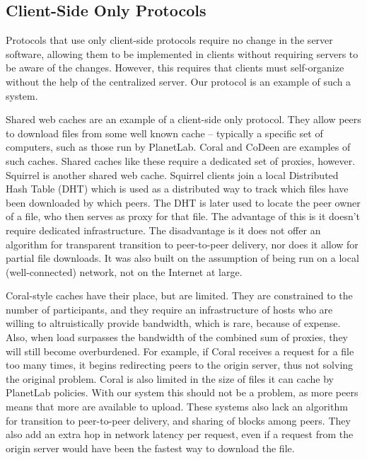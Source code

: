 \subsection{Client-Side Only Protocols}
Protocols that use only client-side protocols require no change in the server software, allowing them to be implemented in clients without requiring servers to be aware of the changes.  However, this requires that clients must self-organize without the help of the centralized server.  Our protocol is an example of such a system.

Shared web caches are an example of a client-side only protocol.  They allow peers to download files from some well known cache -- typically a specific set of computers, such as those run by PlanetLab.  Coral \cite{coral} and CoDeen \cite{codeen} are examples of such caches.  Shared caches like these require a dedicated set of proxies, however.  Squirrel \cite{squirrel} is another shared web cache.  Squirrel clients join a local Distributed Hash Table (DHT) 
which is used as a distributed way to track which files have been downloaded by which peers.  The DHT is later used to locate the peer owner of a file, who then serves as proxy for that file.  The advantage of this is it doesn't require dedicated infrastructure.  The disadvantage is it does not offer an algorithm for transparent transition to peer-to-peer delivery, nor does it allow for partial file downloads.  It was also built on the assumption of being run on a local (well-connected) network, not on the Internet at large.

Coral-style caches have their place, but are limited.  They are constrained to the number of participants, and they require an infrastructure of hosts who are willing to altruistically provide bandwidth, which is rare, because of expense.  Also, when load surpasses the bandwidth of the 
combined sum of proxies, they will still become overburdened.  For example, if Coral receives a request for a file too many times, it begins redirecting peers to the origin server, thus not solving the original problem.  
Coral is also limited in the size of files it can cache by PlanetLab policies.  With our system this should not be a problem, as more peers means that more are available to upload.  These systems also lack an algorithm for transition to peer-to-peer delivery, and sharing of blocks among peers.  They also add an extra hop in network latency per request, even if a request from the origin server would have been the fastest way to download the file.    

